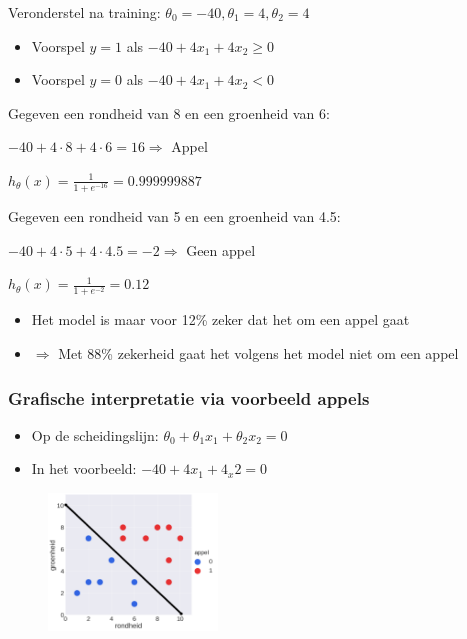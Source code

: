 \documentclass{article}
\begin{document}
Veronderstel na training: $\theta_0=-40, \theta_1=4, \theta_2=4$

\begin{itemize}
    \item Voorspel $y=1$ als $-40 + 4x_1 + 4x_2 \geq 0$
    \item Voorspel $y=0$ als $-40 + 4x_1 + 4x_2 < 0$
\end{itemize}

Gegeven een rondheid van 8 en een groenheid van 6:

\begin{center}
    $-40 + 4 \cdot 8 + 4 \cdot 6 = 16 \Rightarrow $ Appel

    $h_{\theta}(x) = \frac{1}{1 + e^{-16}} = 0.999999887$
\end{center}

Gegeven een rondheid van 5 en een groenheid van 4.5:

\begin{center}
    $-40 + 4 \cdot 5 + 4 \cdot 4.5 = -2 \Rightarrow $ Geen appel

    $h_{\theta}(x) = \frac{1}{1 + e^{-2}} = 0.12$
\end{center}

\begin{itemize}
    \item Het model is maar voor 12\% zeker dat het om een appel gaat
    \item $\Rightarrow$ Met 88\% zekerheid gaat het volgens het model niet om een appel
\end{itemize}

\subsubsection{Grafische interpretatie via voorbeeld appels}

\begin{itemize}
    \item Op de scheidingslijn: $\theta_0 + \theta_1x_1 + \theta_2x_2 = 0$
    \item In het voorbeeld: $-40 + 4x_1 + 4_x2 = 0$
\end{itemize}

\begin{figure}[H]
    \centering
    \includegraphics[width=0.4\textwidth]{logistic-grafische.png}
    \caption{}
\end{figure}
\end{document}

